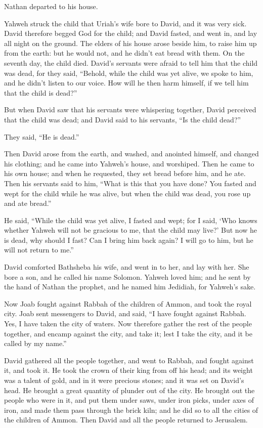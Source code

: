 {Nathan departed to his house.
\par }{\PP Yahweh struck the child that Uriah’s wife bore to David, and it was very sick.
David therefore begged God for the child; and David fasted, and went in, and lay all night on the ground.
The elders of his house arose beside him, to raise him up from the earth: but he would not, and he didn’t eat bread with them.
On the seventh day, the child died. David’s servants were afraid to tell him that the child was dead, for they said, “Behold, while the child was yet alive, we spoke to him, and he didn’t listen to our voice. How will he then harm himself, if we tell him that the child is dead?”
\par }{\PP {}But when David saw that his servants were whispering together, David perceived that the child was dead; and David said to his servants, “Is the child dead?”
\par }{\PP They said, “He is dead.”
\par }{\PP {}Then David arose from the earth, and washed, and anointed himself, and changed his clothing; and he came into Yahweh’s house, and worshiped. Then he came to his own house; and when he requested, they set bread before him, and he ate.
Then his servants said to him, “What is this that you have done? You fasted and wept for the child while he was alive, but when the child was dead, you rose up and ate bread.”
\par }{\PP {}He said, “While the child was yet alive, I fasted and wept; for I said, ‘Who knows whether Yahweh will not be gracious to me, that the child may live?’
But now he is dead, why should I fast? Can I bring him back again? I will go to him, but he will not return to me.”
\par }{\PP {}David comforted Bathsheba his wife, and went in to her, and lay with her. She bore a son, and he called his name Solomon. Yahweh loved him;
and he sent by the hand of Nathan the prophet, and he named him Jedidiah, for Yahweh’s sake.
\par }{\PP {}Now Joab fought against Rabbah of the children of Ammon, and took the royal city.
Joab sent messengers to David, and said, “I have fought against Rabbah. Yes, I have taken the city of waters.
Now therefore gather the rest of the people together, and encamp against the city, and take it; lest I take the city, and it be called by my name.”
\par }{\PP {}David gathered all the people together, and went to Rabbah, and fought against it, and took it.
He took the crown of their king from off his head; and its weight was a talent of gold, and in it were precious stones; and it was set on David’s head. He brought a great quantity of plunder out of the city.
He brought out the people who were in it, and put them under saws, under iron picks, under axes of iron, and made them pass through the brick kiln; and he did so to all the cities of the children of Ammon. Then David and all the people returned to Jerusalem.

}
